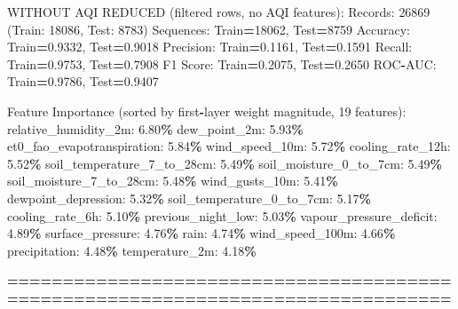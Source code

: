 \documentclass[
  letterpaper,
  DIV=11,
  numbers=noendperiod]{scrartcl}
\newenvironment{Shaded}{\begin{snugshade}}{\end{snugshade}}
\newcommand{\BuiltInTok}[1]{#1}
\newcommand{\DecValTok}[1]{\textcolor[rgb]{0.00,0.00,0.81}{#1}}
\newcommand{\FloatTok}[1]{\textcolor[rgb]{0.00,0.00,0.81}{#1}}
\newcommand{\NormalTok}[1]{#1}
\newcommand{\OperatorTok}[1]{\textcolor[rgb]{0.81,0.36,0.00}{\textbf{#1}}}
\begin{document}
\begin{Shaded}
\begin{Highlighting}[]
\NormalTok{WITHOUT AQI REDUCED (filtered rows, no AQI features):}
\NormalTok{  Records: }\DecValTok{26869}\NormalTok{ (Train: }\DecValTok{18086}\NormalTok{, Test: }\DecValTok{8783}\NormalTok{)}
\NormalTok{  Sequences: Train}\OperatorTok{=}\DecValTok{18062}\NormalTok{, Test}\OperatorTok{=}\DecValTok{8759}
\NormalTok{  Accuracy: Train}\OperatorTok{=}\FloatTok{0.9332}\NormalTok{, Test}\OperatorTok{=}\FloatTok{0.9018}
\NormalTok{  Precision: Train}\OperatorTok{=}\FloatTok{0.1161}\NormalTok{, Test}\OperatorTok{=}\FloatTok{0.1591}
\NormalTok{  Recall: Train}\OperatorTok{=}\FloatTok{0.9753}\NormalTok{, Test}\OperatorTok{=}\FloatTok{0.7908}
\NormalTok{  F1 Score: Train}\OperatorTok{=}\FloatTok{0.2075}\NormalTok{, Test}\OperatorTok{=}\FloatTok{0.2650}
\NormalTok{  ROC}\OperatorTok{{-}}\NormalTok{AUC: Train}\OperatorTok{=}\FloatTok{0.9786}\NormalTok{, Test}\OperatorTok{=}\FloatTok{0.9407}

\NormalTok{  Feature Importance (}\BuiltInTok{sorted}\NormalTok{ by first}\OperatorTok{{-}}\NormalTok{layer weight magnitude, }\DecValTok{19}\NormalTok{ features):}
\NormalTok{    relative\_humidity\_2m: }\FloatTok{6.80}\OperatorTok{\%}
\NormalTok{    dew\_point\_2m: }\FloatTok{5.93}\OperatorTok{\%}
\NormalTok{    et0\_fao\_evapotranspiration: }\FloatTok{5.84}\OperatorTok{\%}
\NormalTok{    wind\_speed\_10m: }\FloatTok{5.72}\OperatorTok{\%}
\NormalTok{    cooling\_rate\_12h: }\FloatTok{5.52}\OperatorTok{\%}
\NormalTok{    soil\_temperature\_7\_to\_28cm: }\FloatTok{5.49}\OperatorTok{\%}
\NormalTok{    soil\_moisture\_0\_to\_7cm: }\FloatTok{5.49}\OperatorTok{\%}
\NormalTok{    soil\_moisture\_7\_to\_28cm: }\FloatTok{5.48}\OperatorTok{\%}
\NormalTok{    wind\_gusts\_10m: }\FloatTok{5.41}\OperatorTok{\%}
\NormalTok{    dewpoint\_depression: }\FloatTok{5.32}\OperatorTok{\%}
\NormalTok{    soil\_temperature\_0\_to\_7cm: }\FloatTok{5.17}\OperatorTok{\%}
\NormalTok{    cooling\_rate\_6h: }\FloatTok{5.10}\OperatorTok{\%}
\NormalTok{    previous\_night\_low: }\FloatTok{5.03}\OperatorTok{\%}
\NormalTok{    vapour\_pressure\_deficit: }\FloatTok{4.89}\OperatorTok{\%}
\NormalTok{    surface\_pressure: }\FloatTok{4.76}\OperatorTok{\%}
\NormalTok{    rain: }\FloatTok{4.74}\OperatorTok{\%}
\NormalTok{    wind\_speed\_100m: }\FloatTok{4.66}\OperatorTok{\%}
\NormalTok{    precipitation: }\FloatTok{4.48}\OperatorTok{\%}
\NormalTok{    temperature\_2m: }\FloatTok{4.18}\OperatorTok{\%}

\OperatorTok{================================================================================}


\end{Highlighting}
\end{Shaded}
\end{document}

